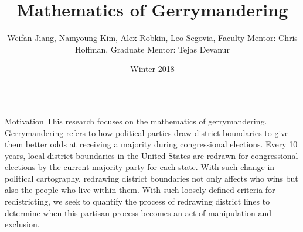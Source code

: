 \documentclass[leqno, handout]{beamer}
\title{
\veryHuge
Mathematics of Gerrymandering}
\author{
  \LARGE
Weifan Jiang, Namyoung Kim, Alex Robkin, Leo Segovia, Faculty Mentor: Chris Hoffman, Graduate Mentor: Tejas Devanur}
\date{\large Winter 2018}
\theoremstyle{definition}
\begin{document}
\begin{frame}


\begin{block}{}
\titlepage
\end{block}


\begin{columns}[t]


\begin{column}[t]{.25\linewidth}

\begin{block}{Motivation}
This research focuses on the mathematics of gerrymandering.
Gerrymandering refers to how political parties draw district
boundaries to give them better odds at receiving a majority during
congressional elections. Every 10 years, local district boundaries in the
United States are redrawn for congressional elections by the current
majority party for each state. With such change in political cartography, redrawing district boundaries not only affects who wins but also the people who live within them. With such loosely defined criteria for
redistricting, we seek to quantify the process of redrawing district
lines to determine when this partisan process becomes an act of
manipulation and exclusion.    


\end{block}
\end{column}
\end{columns}
\end{frame}
\end{document}
